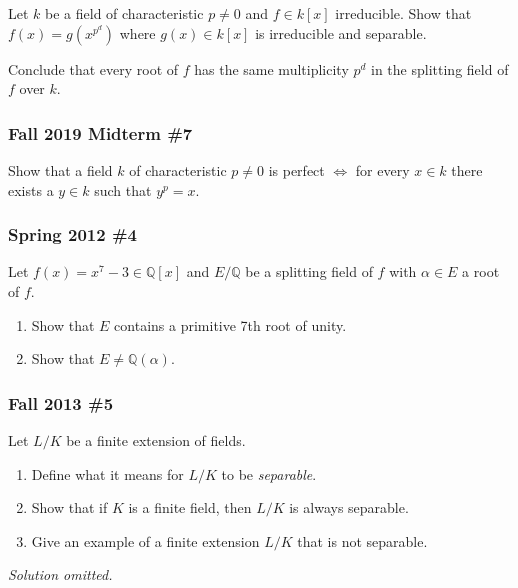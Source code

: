 Let \(k\) be a field of characteristic \(p\neq 0\) and \(f\in k[x]\)
irreducible. Show that \(f(x) = g(x^{p^d})\) where \(g(x) \in k[x]\) is
irreducible and separable.

Conclude that every root of \(f\) has the same multiplicity \(p^d\) in
the splitting field of \(f\) over \(k\).

\hypertarget{fall-2019-midterm-7}{%
\subsubsection{Fall 2019 Midterm \#7}\label{fall-2019-midterm-7}}

Show that a field \(k\) of characteristic \(p\neq 0\) is perfect
\(\iff\) for every \(x\in k\) there exists a \(y\in k\) such that
\(y^p=x\).

\hypertarget{spring-2012-4}{%
\subsubsection{Spring 2012 \#4}\label{spring-2012-4}}

Let \(f(x) = x^7 - 3\in {\mathbb{Q}}[x]\) and \(E/{\mathbb{Q}}\) be a
splitting field of \(f\) with \(\alpha \in E\) a root of \(f\).

\begin{enumerate}
\def\labelenumi{\alph{enumi}.}
\item
  Show that \(E\) contains a primitive 7th root of unity.
\item
  Show that \(E\neq {\mathbb{Q}}(\alpha)\).
\end{enumerate}

\hypertarget{fall-2013-5}{%
\subsubsection{Fall 2013 \#5}\label{fall-2013-5}}

Let \(L/K\) be a finite extension of fields.

\begin{enumerate}
\def\labelenumi{\alph{enumi}.}
\item
  Define what it means for \(L/K\) to be \emph{separable}.
\item
  Show that if \(K\) is a finite field, then \(L/K\) is always
  separable.
\item
  Give an example of a finite extension \(L/K\) that is not separable.
\end{enumerate}

\emph{Solution omitted.}


